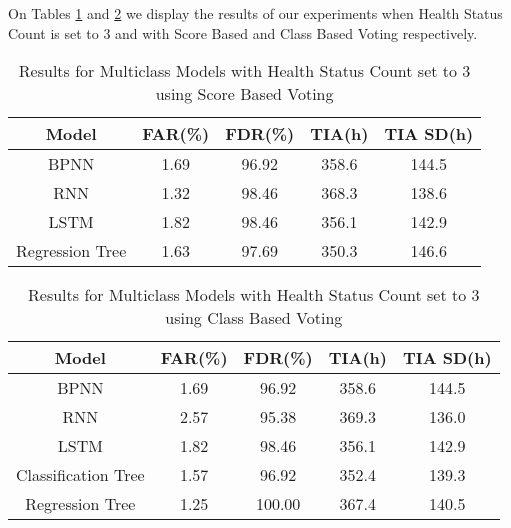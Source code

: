 On Tables \ref{table:results_multiclass_three_health_status_score_voting} and \ref{table:results_multiclass_three_health_status_class_voting} we display the results of our experiments when Health Status Count is set to 3 and with Score Based and Class Based Voting respectively.

\begin{table}
  \begin{center}
    \begin{tabular}{|c|c|c|c|c|}
      \hline
    Model & FAR(\%) & FDR(\%) & TIA(h) & TIA SD(h) \\
    \hline
    BPNN & 1.69 & 96.92 & 358.6 & 144.5 \\
    RNN & 1.32 & 98.46 & 368.3 & 138.6 \\ 
    LSTM & 1.82 & 98.46 & 356.1 & 142.9\\
    Regression Tree & 1.63 & 97.69 & 350.3 & 146.6 \\
    \hline
    \end{tabular}
    \caption[Results Multiclass Models with Health Status Count set to 3, Score Voting]{Results for Multiclass Models with Health Status Count set to 3 using Score Based Voting}
    \label{table:results_multiclass_three_health_status_score_voting}
  \end{center}
\end{table}

\begin{table}
  \begin{center}
    \begin{tabular}{|c|c|c|c|c|}
      \hline
    Model & FAR(\%) & FDR(\%) & TIA(h) & TIA SD(h) \\
    \hline
    BPNN & 1.69 & 96.92 & 358.6 & 144.5 \\
    RNN & 2.57 & 95.38 & 369.3 & 136.0 \\ 
    LSTM & 1.82 & 98.46 & 356.1 & 142.9\\
    Classification Tree & 1.57 & 96.92 & 352.4 & 139.3 \\
    Regression Tree & 1.25 & 100.00 & 367.4 & 140.5 \\
    \hline
    \end{tabular}
    \caption[Results Multiclass Models with Health Status Count set to 3, Class Voting]{Results for Multiclass Models with Health Status Count set to 3 using Class Based Voting}
    \label{table:results_multiclass_three_health_status_class_voting}
  \end{center}
\end{table}

